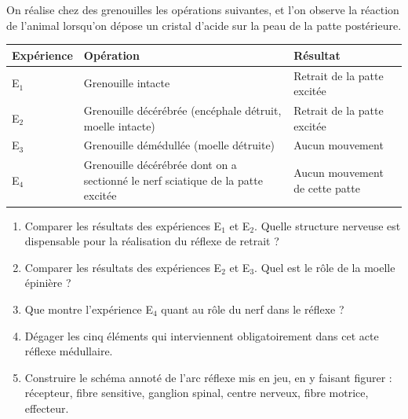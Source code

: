\documentclass[11pt]{article}
\begin{document}
\begin{exercice}
On réalise chez des grenouilles les opérations suivantes, et l'on observe la réaction de l'animal lorsqu'on dépose un cristal d'acide sur la peau de la patte postérieure.

\begin{center}
\begin{tabularx}{\linewidth}{|l|X|X|}
\hline
\rowcolor{popblueL} \textbf{Expérience} & \textbf{Opération} & \textbf{Résultat} \\
\hline
E$_1$ & Grenouille intacte & Retrait de la patte excitée \\
\hline
E$_2$ & Grenouille décérébrée (encéphale détruit, moelle intacte) & Retrait de la patte excitée \\
\hline
E$_3$ & Grenouille démédullée (moelle détruite) & Aucun mouvement \\
\hline
E$_4$ & Grenouille décérébrée dont on a sectionné le nerf sciatique de la patte excitée & Aucun mouvement de cette patte \\
\hline
\end{tabularx}
\end{center}

\begin{enumerate}
\item Comparer les résultats des expériences E$_1$ et E$_2$. Quelle structure nerveuse est dispensable pour la réalisation du réflexe de retrait ?
\item Comparer les résultats des expériences E$_2$ et E$_3$. Quel est le rôle de la moelle épinière ?
\item Que montre l'expérience E$_4$ quant au rôle du nerf dans le réflexe ?
\item Dégager les cinq éléments qui interviennent obligatoirement dans cet acte réflexe médullaire.
\item Construire le schéma annoté de l'arc réflexe mis en jeu, en y faisant figurer : récepteur, fibre sensitive, ganglion spinal, centre nerveux, fibre motrice, effecteur.
\end{enumerate}
\end{exercice}
\end{document}
